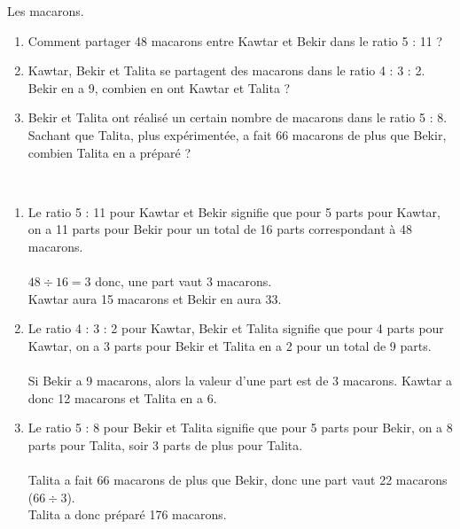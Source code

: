 \begin{colonne*exercice}
\bigskip


\begin{exercice}
   Les macarons.
   \begin{enumerate}
      \item Comment partager 48 macarons entre Kawtar et Bekir dans le ratio 5 : 11 ?
      \item Kawtar, Bekir et Talita se partagent des macarons dans le ratio 4 : 3 : 2. Bekir en a 9, combien en ont Kawtar et Talita ?
      \item Bekir et Talita ont réalisé un certain nombre de macarons dans le ratio 5 : 8. Sachant que Talita, plus expérimentée, a fait 66 macarons de plus que Bekir, combien Talita en a préparé ?
   \end{enumerate}
\end{exercice}

\begin{corrige}
\ \\ [-5mm]
   \begin{enumerate}
      \item Le ratio 5 : 11 pour Kawtar et Bekir signifie que pour 5 parts pour Kawtar, on a 11 parts pour Bekir pour un total de 16 parts correspondant à 48 macarons. \\ [2mm]
            \qquad {} \\
         $48\div16 =3$ donc, une part vaut 3 macarons. \\
         {\blue Kawtar aura 15 macarons et Bekir en aura 33.} 
      \item Le ratio 4 : 3 : 2 pour Kawtar, Bekir et Talita signifie que pour 4 parts pour Kawtar, on a 3 parts pour Bekir et Talita en a 2 pour un total de 9 parts. \\ [2mm]
            \quad {} \\
         Si Bekir a 9 macarons, alors la valeur d'une part est de 3 macarons.
         {\blue Kawtar a donc 12 macarons et Talita en a 6.} 
      \item Le ratio 5 : 8 pour Bekir et Talita signifie que pour 5 parts pour Bekir, on a 8 parts pour Talita, soir 3 parts de plus pour Talita.\\ [2mm]
            \qquad {} \\
         Talita a fait 66 macarons de plus que Bekir, donc une part vaut 22 macarons ($66\div3$). \\
         {\blue Talita a donc préparé 176 macarons.} 
   \end{enumerate}
\end{corrige}


\end{colonne*exercice}
